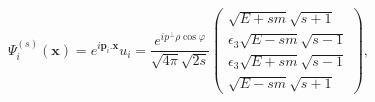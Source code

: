 \begin{equation}
\Psi ^{(s)}_{i}(\mathbf{x})=e^{i\mathbf{p}_{i}.\mathbf{x}}u_{i}=\frac{e^{ip^{\bot
}\rho \cos \varphi }}{\sqrt{4\pi}\sqrt{2s}}\left(
\begin{array}{c}
\sqrt{E+sm}\sqrt{s+1} \\
\epsilon _{3}\sqrt{E-sm}\sqrt{s-1} \\
\epsilon _{3}\sqrt{E+sm}\sqrt{s-1} \\
\sqrt{E-sm}\sqrt{s+1}
\end{array}
\right) ,
\end{equation}

